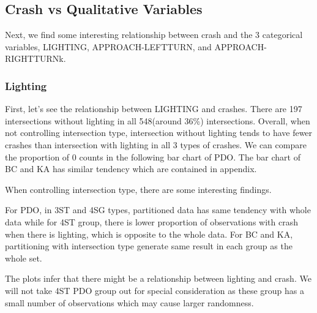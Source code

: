 \documentclass[11pt]{scrartcl} %
\begin{document}
\subsection{Crash vs Qualitative Variables}

Next, we find some interesting relationship between crash and the 3 categorical variables, LIGHTING, APPROACH-LEFTTURN, and APPROACH-RIGHTTURNk.

\subsubsection{Lighting}

First, let's see the relationship between LIGHTING and crashes. There are 197 intersections without lighting in all 548(around 36\%) intersections. Overall, when not controlling intersection type, intersection without lighting tends to have fewer crashes than intersection with lighting in all 3 types of crashes. We can compare the proportion of 0 counts in the following bar chart of PDO. The bar chart of BC and KA has similar tendency which are contained in appendix.

When controlling intersection type, there are some interesting findings.

For PDO, in 3ST and 4SG types, partitioned data has same tendency with whole data while for 4ST group, there is lower proportion of observations with crash when there is lighting, which is opposite to the whole data. For BC and KA, partitioning with intersection type generate same result in each group as the whole set.

The plots infer that there might be a relationship between lighting and crash. We will not take 4ST PDO group out for special consideration as these group has a small number of observations which may cause larger randomness.
\end{document}
